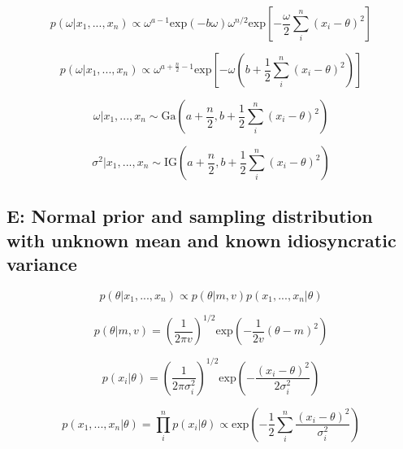 \documentclass[12pt]{article}
\begin{document}
            \begin{equation}
                  p(\omega|x_1,..., x_n) \propto \omega^{a-1} \text{exp}(-b \omega) \omega^{n/2} \text{exp} \left [ -\frac{\omega}{2}\sum_i^n(x_i - \theta)^2\right]
            \end{equation}

            \begin{equation}
                  p(\omega|x_1,..., x_n) \propto \omega^{a + \frac{n}{2} - 1} \text{exp} \left [ -\omega \left (b+ \frac{1}{2}\sum_i^n(x_i - \theta)^2 \right )\right]
            \end{equation}

            \begin{equation}
                  \omega | x_1,...,x_n \sim \text{Ga}\left (a + \frac{n}{2}, b+ \frac{1}{2}\sum_i^n(x_i - \theta)^2\right )
            \end{equation}

            \begin{equation}
                  \sigma^2 | x_1,...,x_n \sim \text{IG}\left (a + \frac{n}{2}, b+ \frac{1}{2}\sum_i^n(x_i - \theta)^2\right )
            \end{equation}

      \subsection*{E: Normal prior and sampling distribution with unknown mean and known idiosyncratic variance}

            \begin{equation}
                  p(\theta|x_1,..., x_n) \propto p(\theta|m,v)p(x_1,...,x_n|\theta)
            \end{equation}

            \begin{equation}
                  p(\theta|m,v) = \left(\frac{1}{2 \pi v} \right )^{1/2} \text{exp}\left( - \frac{1}{2v} (\theta - m)^2\right )
            \end{equation}

            \begin{equation}
                  p(x_i|\theta) = \left(\frac{1}{2 \pi \sigma_i^2} \right )^{1/2} \text{exp}\left( - \frac{(x_i - \theta)^2}{2 \sigma_i^2} \right )
            \end{equation}

            \begin{equation}
                  p(x_1,...,x_n|\theta) = \prod_i^n p(x_i|\theta) \propto \text{exp}\left( - \frac{1}{2} \sum_i^n\frac{(x_i - \theta)^2}{\sigma_i^2} \right )
            \end{equation}
\end{document}
